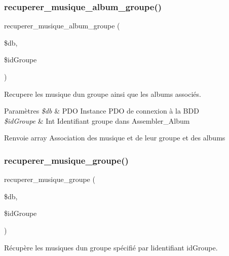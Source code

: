 \subsubsection{\texorpdfstring{recuperer\+\_\+musique\+\_\+album\+\_\+groupe()}{recuperer\_musique\_album\_groupe()}}
{\footnotesize\ttfamily recuperer\+\_\+musique\+\_\+album\+\_\+groupe (\begin{DoxyParamCaption}\item[{}]{\$db,  }\item[{}]{\$id\+Groupe }\end{DoxyParamCaption})}



Recupere les musique d\textquotesingle{}un groupe ainsi que les albums associés. 


\begin{DoxyParams}{Paramètres}
{\em \$db} & P\+DO Instance P\+DO de connexion à la B\+DD \\
\hline
{\em \$id\+Groupe} & Int Identifiant groupe dans Assembler\+\_\+\+Album \\
\hline
\end{DoxyParams}
\begin{DoxyReturn}{Renvoie}
array Association des musique et de leur groupe et des albums 
\end{DoxyReturn}
\mbox{\label{fonctionGroupe_8php_a51bb71b4c783c8ad6dd4b711e535a9cf}} 
\subsubsection{\texorpdfstring{recuperer\+\_\+musique\+\_\+groupe()}{recuperer\_musique\_groupe()}}
{\footnotesize\ttfamily recuperer\+\_\+musique\+\_\+groupe (\begin{DoxyParamCaption}\item[{}]{\$db,  }\item[{}]{\$id\+Groupe }\end{DoxyParamCaption})}



Récupère les musiques d\textquotesingle{}un groupe spécifié par l\textquotesingle{}identifiant \textquotesingle{}id\+Groupe\textquotesingle{}. 


